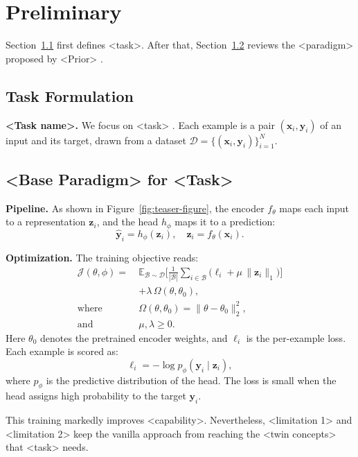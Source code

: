 \section{Preliminary}
Section~\ref{sec:task-formulation} first defines <task>.
After that, Section~\ref{sec:base-paradigm} reviews the <paradigm> proposed by <Prior> \cite{Placeholder-A}.

\subsection{Task Formulation} \label{sec:task-formulation}
\textbf{<Task name>.} We focus on <task> \cite{Placeholder-A, Placeholder-B}.
Each example is a pair $(\mathbf{x}_i, \mathbf{y}_i)$ of an input and its target, drawn from a dataset $\mathcal{D} = \{(\mathbf{x}_i, \mathbf{y}_i)\}_{i=1}^{N}$.

\subsection{<Base Paradigm> for <Task>} \label{sec:base-paradigm}
\textbf{Pipeline.}
As shown in Figure~\ref{fig:teaser-figure}, the encoder $f_\theta$ maps each input to a representation $\mathbf{z}_i$, and the head $h_\phi$ maps it to a prediction:
\begin{equation}
\hat{\mathbf{y}}_{i} = h_\phi(\mathbf{z}_{i}), \quad \mathbf{z}_{i} = f_\theta(\mathbf{x}_{i}).
\end{equation}

\textbf{Optimization.}
The training objective reads:
\begin{equation}
\begin{aligned}
\mathcal{J}(\theta, \phi)
= \ &\mathbb{E}_{\mathcal{B}\sim \mathcal{D}}
\Bigg[
\frac{1}{|\mathcal{B}|}\sum_{i \in \mathcal{B}}
\Big(\ell_{i} + \mu\, \|\mathbf{z}_{i}\|_{1}\Big)
\Bigg]\\
&+ \lambda\, \Omega(\theta, \theta_{0}),\\
\text{where}\quad & \Omega(\theta, \theta_{0})
= \|\theta - \theta_{0}\|_{2}^{2},\\
\text{and}\quad & \mu, \lambda \geq 0.
\end{aligned}
\label{eq:objective}
\end{equation}
Here $\theta_{0}$ denotes the pretrained encoder weights, and $\ell_{i}$ is the per-example loss.
Each example is scored as:
\begin{equation}\label{eq:example-score}
\ell_{i} = -\log p_\phi(\mathbf{y}_{i} \mid \mathbf{z}_{i}),
\end{equation}
where $p_\phi$ is the predictive distribution of the head.
The loss is small when the head assigns high probability to the target $\mathbf{y}_{i}$.

This training markedly improves <capability>.
Nevertheless, <limitation 1> and <limitation 2> keep the vanilla approach from reaching the <twin concepts> that <task> needs.
